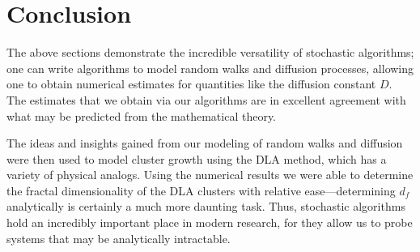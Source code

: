 \documentclass[aps,prl,preprint,superscriptaddress]{revtex4}
\begin{document}
 
 \section{Conclusion}
 
The above sections demonstrate the incredible versatility of stochastic algorithms; one can write algorithms to model random walks and diffusion processes, allowing one to obtain numerical estimates for quantities like the diffusion constant $D$. The estimates that we obtain via our algorithms are in excellent agreement with what may be predicted from the mathematical theory. 

The ideas and insights gained from our modeling of random walks and diffusion were then used to model cluster growth using the DLA method, which has a variety of physical analogs. Using the numerical results we were able to determine the fractal dimensionality of the DLA clusters with relative ease---determining $d_f$ analytically is certainly a much more daunting task. Thus, stochastic algorithms hold an incredibly important place in modern research, for they allow us to probe systems that may be analytically intractable.
 
\end{document}
